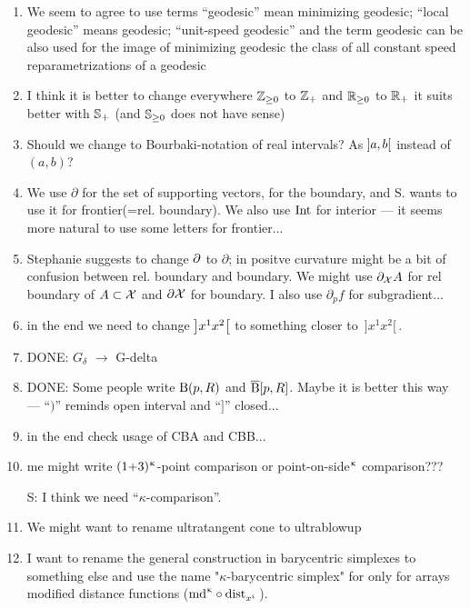\begin{enumerate}
\item We seem to agree to use terms
``geodesic'' mean minimizing geodesic;
``local geodesic'' means geodesic;
``unit-speed geodesic'' and the term geodesic can be also used for
 the image of minimizing geodesic
the class of all constant speed reparametrizations of a geodesic 

\item I think it is better to change everywhere $\ZZ_{\ge0}$ to $\mathbb{Z}_+$ and $\RR_{\ge0}$ to $\mathbb{R}_+$ it suits better with $\mathbb{S}_+$ (and $\SS_{\ge0}$ does not have sense)

\item Should we change to Bourbaki-notation of real intervals? As $\hskip-0.1em\left]a,b\right[$ instead of $(a,b)$?

\item We use $\partial$ for the set of supporting vectors, for the boundary, and S. wants to use it for frontier(=rel. boundary). We also use $\mathop{\rm Int}\nolimits$ for interior --- it seems more natural to use some letters for frontier...

\item Stephanie suggests to change $\partial$ to $\partial$; in positve curvature might be  a bit of confusion between rel. boundary and boundary. We might use $\partial_{\mathcal{X}}A$ for rel boundary of $A\subset \spc{X}$ and $\partial\mathcal{X}$ for boundary. I also use $\partial_p f$ for subgradient...

\item in the end we need to change $\hskip-0.1em\left]x^1x^2\right[$ to something closer to 
$\,{]}x^1x^2{[}\,$.

\item DONE: $G_\delta$ $\to$ G-delta

\item DONE: Some people write $\mathrm{B}{}(p,R)$ and $\overline{\mathrm{B}}{}[p,R]$. 
Maybe it is better this way --- ``$)$'' reminds open interval and ``$]$'' closed...

\item in the end check usage of CBA and CBB...

\item me might write $(1{+}3)^{\upkappa}$-point comparison or point-on-side${}^{\upkappa}$ comparison???

S: I think we need   ``$\kappa$-comparison''.

\item We might want to rename ultratangent cone to ultrablowup

\item I want to rename the general construction 
in barycentric simplexes to something else
and use the name "$\kappa$-barycentric simplex"
for only for arrays modified distance functions
($\md\kappa\circ\distfun{x^i}{}{}$).


\end{enumerate}
